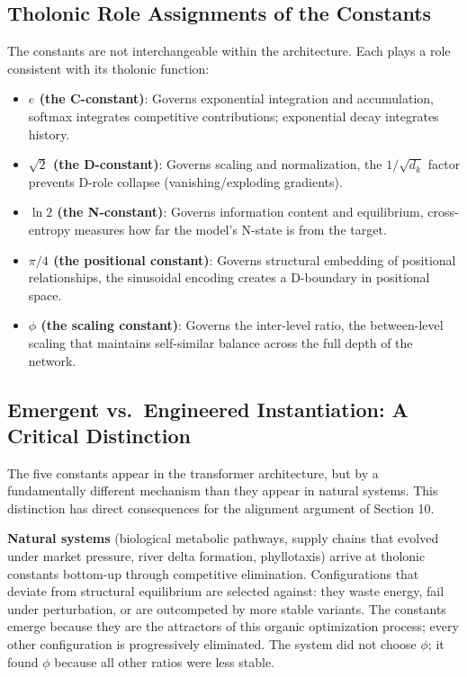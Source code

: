 \documentclass[12pt]{article}
\providecommand{\tightlist}{%
  \setlength{\itemsep}{0pt}\setlength{\parskip}{0pt}}
\begin{document}
\subsection{Tholonic Role Assignments of the Constants}\label{tholonic-role-assignments-of-the-constants}

The constants are not interchangeable within the architecture. Each
plays a role consistent with its tholonic function:

\begin{itemize}
\tightlist
\item
  \textbf{\(e\) (the C-constant)}: Governs exponential integration and
  accumulation, softmax integrates competitive contributions;
  exponential decay integrates history.
\item
  \textbf{\(\sqrt{2}\) (the D-constant)}: Governs scaling and
  normalization, the \(1/\sqrt{d_k}\) factor prevents D-role collapse
  (vanishing/exploding gradients).
\item
  \textbf{\(\ln 2\) (the N-constant)}: Governs information content and
  equilibrium, cross-entropy measures how far the model's N-state is
  from the target.
\item
  \textbf{\(\pi/4\) (the positional constant)}: Governs structural
  embedding of positional relationships, the sinusoidal encoding creates
  a D-boundary in positional space.
\item
  \textbf{\(\phi\) (the scaling constant)}: Governs the inter-level
  ratio, the between-level scaling that maintains self-similar balance
  across the full depth of the network.
\end{itemize}

\subsection{Emergent vs.~Engineered Instantiation: A Critical Distinction}\label{emergent-vs.-engineered-instantiation-a-critical-distinction}

The five constants appear in the transformer architecture, but by a
fundamentally different mechanism than they appear in natural systems.
This distinction has direct consequences for the alignment argument of
Section 10.

\textbf{Natural systems} (biological metabolic pathways, supply chains
that evolved under market pressure, river delta formation, phyllotaxis)
arrive at tholonic constants bottom-up through competitive elimination.
Configurations that deviate from structural equilibrium are selected
against: they waste energy, fail under perturbation, or are outcompeted
by more stable variants. The constants emerge because they are the
attractors of this organic optimization process; every other
configuration is progressively eliminated. The system did not choose
\(\phi\); it found \(\phi\) because all other ratios were less stable.
\end{document}
